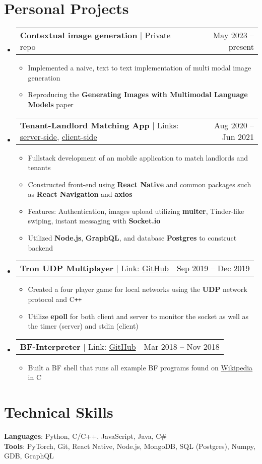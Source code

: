 \documentclass[letterpaper,11pt]{article}
\makeatletter
\newcommand{\resumeItem}[1]{
  \item\small{
    {#1 \vspace{0pt}}
  }
}
\newcommand{\resumeProjectHeading}[2]{
    \item
    \begin{tabular*}{0.97\textwidth}{l@{\extracolsep{\fill}}r}
      \small#1 & #2 \\
    \end{tabular*}\vspace{-5pt}
}
\newcommand{\resumeSubHeadingListStart}{\begin{itemize}[leftmargin=0.15in, label={}]}
\newcommand{\resumeSubHeadingListEnd}{\end{itemize}}
\newcommand{\resumeItemListStart}{\begin{itemize}}
\newcommand{\resumeItemListEnd}{\end{itemize}\vspace{-7pt}}
\makeatother
\begin{document}
\section{Personal Projects}
    \resumeSubHeadingListStart
      \resumeProjectHeading
        {\textbf{Contextual image generation} $|$ Private repo}{May 2023 -- present}
        \resumeItemListStart
          \resumeItem{Implemented a naive, text to text implementation of multi modal image generation}
          \resumeItem{Reproducing the \textbf{Generating Images with Multimodal Language Models} paper}
        \resumeItemListEnd
      \resumeProjectHeading
        {\textbf{Tenant-Landlord Matching App} $|$ Links: \href{https://github.com/JaLnYn/pk2_ser}{server-side}, \href{https://github.com/JaLnYn/pk2_cli}{client-side}}{Aug 2020 -- Jun 2021}
        \resumeItemListStart
          \resumeItem{Fullstack development of an mobile application to match landlords and tenants}
          \resumeItem{Constructed front-end using \textbf{React Native} and common packages such as \textbf{React Navigation} and \textbf{axios}}
          \resumeItem{Features: Authentication, images upload utilizing \textbf{multer}, Tinder-like swiping, instant messaging with \textbf{Socket.io}}
          \resumeItem{Utilized \textbf{Node.js}, \textbf{GraphQL}, and database \textbf{Postgres} to construct backend}
        \resumeItemListEnd
      \resumeProjectHeading
        {\textbf{Tron UDP Multiplayer} $|$ Link: \href{https://github.com/JaLnYn/Tron}{GitHub}}{Sep 2019 -- Dec 2019}
        \resumeItemListStart
          \resumeItem{Created a four player game for local networks using the \textbf{UDP} network protocol and C\texttt{++}}
          \resumeItem{Utilize \textbf{epoll} for both client and server to monitor the socket as well as the timer (server) and stdin (client)}
        \resumeItemListEnd
      \resumeProjectHeading
        {\textbf{BF-Interpreter} $|$ Link: \href{https://github.com/JaLnYn/Bf-interpreter}{GitHub}}{Mar 2018 -- Nov 2018}
        \resumeItemListStart
          \resumeItem{Built a BF shell that runs all example BF programs found on \href{https://en.wikipedia.org/wiki/Esoteric_programming_language\#Binary_lambda_calculus}{\underline{Wikipedia}} in C}
        \resumeItemListEnd
    \resumeSubHeadingListEnd
%
\section{Technical Skills}
 \begin{itemize}[leftmargin=0.15in, label={}]
    \small{\item{
     \textbf{Languages}{: Python, C/C++, JavaScript, Java, C\#} \\
     \textbf{Tools}{: PyTorch, Git, React Native, Node.js, MongoDB, SQL (Postgres), Numpy, GDB, GraphQL} \\
    }}
 \end{itemize}


\end{document}
